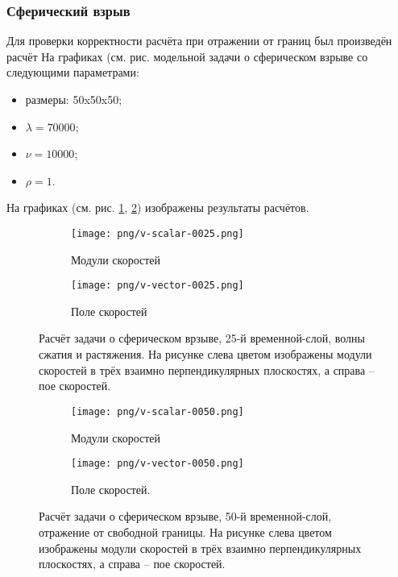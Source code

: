 \subsubsection{Сферический взрыв}
Для проверки корректности расчёта при отражении от границ был произведён расчёт
На графиках (см. рис.
модельной задачи о сферическом взрыве со следующими параметрами:
\begin{itemize}
\item размеры: 50x50x50;
\item $\lambda=70000$;
\item $\nu=10000$;
\item $\rho=1$.
\end{itemize}
На графиках (см. рис. \ref{pic:spherical_25}, \ref{pic:spherical_50}) изображены
результаты расчётов.
\begin{figure}[htp]
\begin{subfigure}[b]{0.5\textwidth}
\centering
\texttt{[image: png/v-scalar-0025.png]}
\caption{Модули скоростей}
\end{subfigure}
\begin{subfigure}[b]{0.5\textwidth}
\centering
\texttt{[image: png/v-vector-0025.png]}
\caption{Поле скоростей}
\end{subfigure}
\caption{Расчёт задачи о сферическом врзыве, 25-й временной-слой, волны сжатия и
растяжения. На рисунке слева цветом изображены модули скоростей в трёх взаимно
перпендикулярных плоскостях, а справа -- пое скоростей.}
\label{pic:spherical_25}
\end{figure}
\begin{figure}[htp]
\begin{subfigure}[b]{0.5\textwidth}
\centering
\texttt{[image: png/v-scalar-0050.png]}
\caption{Модули скоростей}
\end{subfigure}
\begin{subfigure}[b]{0.5\textwidth}
\centering
\texttt{[image: png/v-vector-0050.png]}
\caption{Поле скоростей.}
\end{subfigure}
\caption{Расчёт задачи о сферическом врзыве, 50-й временной-слой, отражение от
свободной границы. На рисунке слева цветом изображены модули скоростей в трёх взаимно
перпендикулярных плоскостях, а справа -- пое скоростей.}
\label{pic:spherical_50}
\end{figure}
\clearpage
